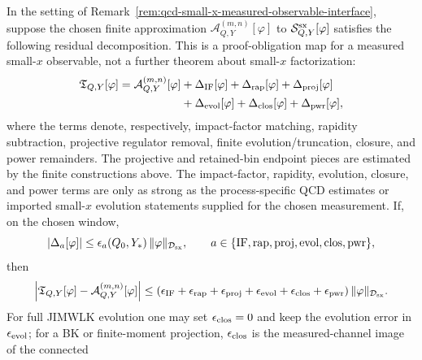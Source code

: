 \begin{remark}
\label{rem:qcd-small-x-measured-proof-obligation-map}
In the setting of
Remark~\ref{rem:qcd-small-x-measured-observable-interface}, suppose
the chosen finite approximation
\(\mathcal A^{(m,n)}_{Q,Y}[\varphi]\) to
\(\mathcal S^{\rm sx}_{Q,Y}[\varphi]\) satisfies the following residual
decomposition.  This is a proof-obligation map for a measured small-\(x\)
observable, not a further theorem about small-\(x\) factorization:
\begin{equation}
\begin{aligned}
  \mathfrak T_{Q,Y}[\varphi]
  =
  \mathcal A^{(m,n)}_{Q,Y}[\varphi]
  &+\Delta_{\rm IF}[\varphi]
  +\Delta_{\rm rap}[\varphi]
  +\Delta_{\rm proj}[\varphi]
\\
  &+\Delta_{\rm evol}[\varphi]
  +\Delta_{\rm clos}[\varphi]
  +\Delta_{\rm pwr}[\varphi],
\end{aligned}
\label{eq:qcd-small-x-measured-residual-decomposition}
\end{equation}
where the terms denote, respectively, impact-factor matching, rapidity
subtraction, projective regulator removal, finite evolution/truncation,
closure, and power remainders.  The projective and retained-bin endpoint
pieces are estimated by the finite constructions above.  The impact-factor,
rapidity, evolution, closure, and power terms are only as strong as the
process-specific QCD estimates or imported small-\(x\) evolution statements
supplied for the chosen measurement.  If, on the chosen window,
\begin{equation}
  |\Delta_a[\varphi]|
  \leq
  \epsilon_a(Q_0,Y_*)\,\|\varphi\|_{\mathcal D_{\rm sx}},
  \qquad
  a\in
  \{\mathrm{IF},\mathrm{rap},\mathrm{proj},
    \mathrm{evol},\mathrm{clos},\mathrm{pwr}\},
  \label{eq:qcd-small-x-measured-residual-component-bounds}
\end{equation}
then
\begin{equation}
  \left|
    \mathfrak T_{Q,Y}[\varphi]
    -
    \mathcal A^{(m,n)}_{Q,Y}[\varphi]
  \right|
  \leq
  \left(
    \epsilon_{\rm IF}
    +\epsilon_{\rm rap}
    +\epsilon_{\rm proj}
    +\epsilon_{\rm evol}
    +\epsilon_{\rm clos}
    +\epsilon_{\rm pwr}
  \right)
  \|\varphi\|_{\mathcal D_{\rm sx}} .
  \label{eq:qcd-small-x-measured-residual-budget-bound}
\end{equation}
For full JIMWLK evolution one may set
\(\epsilon_{\rm clos}=0\) and keep the evolution error in
\(\epsilon_{\rm evol}\); for a BK or finite-moment projection,
\(\epsilon_{\rm clos}\) is the measured-channel image of the connected

\end{remark}
